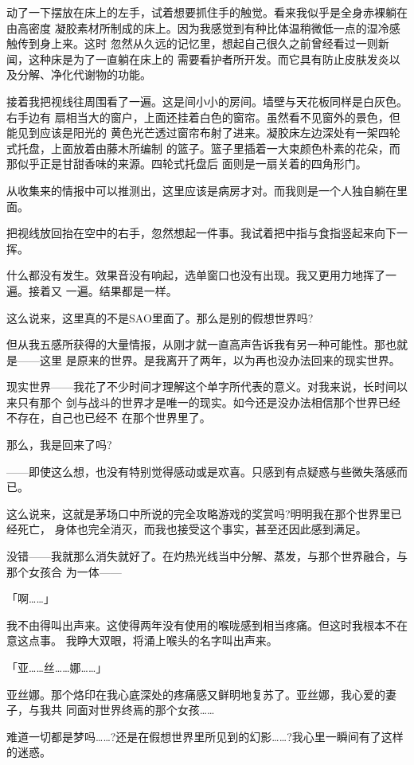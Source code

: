 \documentclass[11pt]{book}
\begin{document}
动了一下摆放在床上的左手，试着想要抓住手的触觉。看来我似乎是全身赤裸躺在由高密度
凝胶素材所制成的床上。因为我感觉到有种比体温稍微低一点的湿冷感触传到身上来。这时
忽然从久远的记忆里，想起自己很久之前曾经看过一则新闻，这种床是为了一直躺在床上的
需要看护者所开发。而它具有防止皮肤发炎以及分解、净化代谢物的功能。

接着我把视线往周围看了一遍。这是间小小的房间。墙壁与天花板同样是白灰色。右手边有
扇相当大的窗户，上面还挂着白色的窗帘。虽然看不见窗外的景色，但能见到应该是阳光的
黄色光芒透过窗帘布射了进来。凝胶床左边深处有一架四轮式托盘，上面放着由藤木所编制
的篮子。篮子里插着一大束颜色朴素的花朵，而那似乎正是甘甜香味的来源。四轮式托盘后
面则是一扇关着的四角形门。

从收集来的情报中可以推测出，这里应该是病房才对。而我则是一个人独自躺在里面。

把视线放回抬在空中的右手，忽然想起一件事。我试着把中指与食指竖起来向下一挥。

什么都没有发生。效果音没有响起，选单窗口也没有出现。我又更用力地挥了一遍。接着又
一遍。结果都是一样。

这么说来，这里真的不是SAO里面了。那么是别的假想世界吗?

但从我五感所获得的大量情报，从刚才就一直高声告诉我有另一种可能性。那也就是——这里
是原来的世界。是我离开了两年，以为再也没办法回来的现实世界。

现实世界——我花了不少时间才理解这个单字所代表的意义。对我来说，长时间以来只有那个
剑与战斗的世界才是唯一的现实。如今还是没办法相信那个世界已经不存在，自己也已经不
在那个世界里了。

那么，我是回来了吗?

——即使这么想，也没有特别觉得感动或是欢喜。只感到有点疑惑与些微失落感而已。

这么说来，这就是茅场口中所说的完全攻略游戏的奖赏吗?明明我在那个世界里已经死亡，
身体也完全消灭，而我也接受这个事实，甚至还因此感到满足。

没错——我就那么消失就好了。在灼热光线当中分解、蒸发，与那个世界融合，与那个女孩合
为一体——

「啊……」

我不由得叫出声来。这使得两年没有使用的喉咙感到相当疼痛。但这时我根本不在意这点事。
我睁大双眼，将涌上喉头的名字叫出声来。

「亚……丝……娜……」

亚丝娜。那个烙印在我心底深处的疼痛感又鲜明地复苏了。亚丝娜，我心爱的妻子，与我共
同面对世界终焉的那个女孩……

难道一切都是梦吗……?还是在假想世界里所见到的幻影……?我心里一瞬间有了这样的迷惑。
\end{document}
